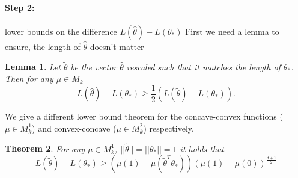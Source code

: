 \documentclass[twoside]{article} \usepackage{aistats2017}
\newtheorem{theorem}{Theorem}
\newtheorem{lemma}[theorem]{Lemma}
\begin{document}
\paragraph{Step 2:} lower bounds on the difference $L(\hat{\theta})-L(\theta_*)$
First we need a lemma to ensure, the length of $\hat{\theta}$ doesn't matter
\begin{lemma}\label{normthetabound}
    Let $\tilde{\theta}$ be the vector $\hat{\theta}$ rescaled such that it matches the length of $\theta_*$. Then for any $\mu\in M_k$
    $$L(\hat{\theta})-L(\theta_*) \geq \frac{1}{2}(L(\tilde{\theta})-L(\theta_*)).$$
\end{lemma}
We give a different lower bound theorem for the concave-convex functions ($\mu\in M_k^1$) and convex-concave ($\mu\in M_k^2$) respectively.
\begin{theorem}
For any $\mu \in M_k^1$, $||\tilde{\theta}||=||\theta_*||=1$ it holds that
$$L(\tilde{\theta})-L(\theta_*) \geq (\mu(1)-\mu(\tilde{\theta}^T\theta_*))(\mu(1)-\mu(0))^{\frac{d+1}{2}}$$
\end{theorem}
\end{document}

